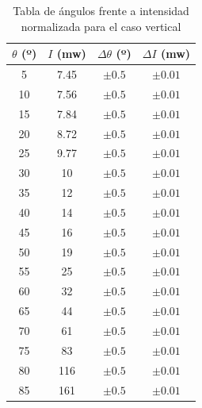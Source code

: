 \documentclass[11pt, a4paper, twocolumn]{article}
\begin{document}
\begin{table}[H]
    \centering
    \small
    \begin{tabular}{cccc}
        \hline
        $\theta$ (º) &   $I$ (mw) & $\Delta \theta$ (º)   & $\Delta I$ (mw)   \\
        \hline
                            5 &     7.45 & $\pm 0.5$                    & $\pm 0.01$      \\
                            10 &     7.56 & $\pm 0.5$                    & $\pm 0.01$      \\
                            15 &     7.84 & $\pm 0.5$                    & $\pm 0.01$      \\
                            20 &     8.72 & $\pm 0.5$                    & $\pm 0.01$      \\
                            25 &     9.77 & $\pm 0.5$                    & $\pm 0.01$      \\
                            30 &    10    & $\pm 0.5$                    & $\pm 0.01$      \\
                            35 &    12    & $\pm 0.5$                    & $\pm 0.01$      \\
                            40 &    14    & $\pm 0.5$                    & $\pm 0.01$      \\
                            45 &    16    & $\pm 0.5$                    & $\pm 0.01$      \\
                            50 &    19    & $\pm 0.5$                    & $\pm 0.01$      \\
                            55 &    25    & $\pm 0.5$                    & $\pm 0.01$      \\
                            60 &    32    & $\pm 0.5$                    & $\pm 0.01$      \\
                            65 &    44    & $\pm 0.5$                    & $\pm 0.01$      \\
                            70 &    61    & $\pm 0.5$                    & $\pm 0.01$      \\
                            75 &    83    & $\pm 0.5$                    & $\pm 0.01$      \\
                            80 &   116    & $\pm 0.5$                    & $\pm 0.01$      \\
                            85 &   161    & $\pm 0.5$                    & $\pm 0.01$      \\
        \hline
    \end{tabular}
    \caption{Tabla de ángulos frente a intensidad normalizada para el caso vertical}
    \label{Tabla_1}
\end{table}
\end{document}
